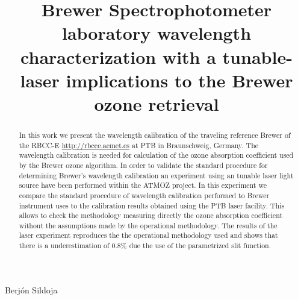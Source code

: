 \documentclass[acp]{copernicus} %
\begin{document}
\title{Brewer Spectrophotometer laboratory wavelength characterization with a tunable-laser implications to the Brewer ozone retrieval}


 {Berjón}
 {Sildoja}












\received{}
\pubdiscuss{} %
\revised{}
\accepted{}
\published{}




\maketitle



\begin{abstract}

In this work we present the wavelength calibration of the traveling reference Brewer of the RBCC-E  \url{http://rbcce.aemet.es}  at PTB in Braunschweig, Germany. The wavelength calibration is needed for calculation of the ozone absorption coefficient used by the Brewer ozone algorithm. In order to validate the standard procedure for determining Brewer’s wavelength calibration an  experiment using an tunable laser light source have been performed within the ATMOZ project. In this experiment we compare the standard procedure of wavelength calibration performed to Brewer instrument uses to the calibration results obtained using the PTB laser facility. This allows to check the methodology measuring directly the ozone absorption coefficient without the assumptions made by the operational methodology.  The results of the laser experiment reproduces the  the operational methodology used and shows that there is a underestimation of 0.8\%  due the use of the parametrized slit function. 
\end{abstract}
\end{document}
